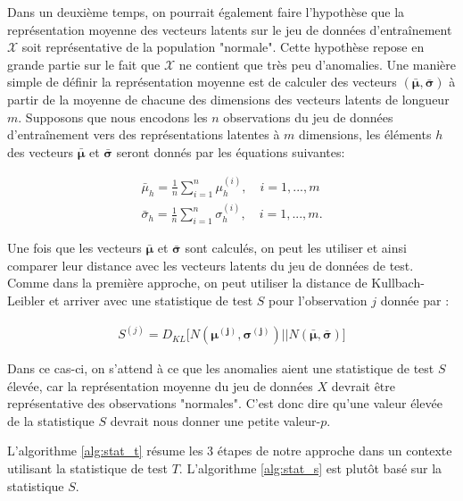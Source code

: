 Dans un deuxième temps, on pourrait également faire l'hypothèse que la représentation moyenne des vecteurs latents sur le jeu de données d'entraînement $\mathcal{X}$ soit représentative de la population "normale". Cette hypothèse repose en grande partie sur le fait que $\mathcal{X}$ ne contient que très peu d'anomalies. Une manière simple de définir la représentation moyenne est de calculer des vecteurs $(\boldsymbol{\bar{\mu}}, \boldsymbol{\bar{\sigma}})$ à partir de la moyenne de chacune des dimensions des vecteurs latents de longueur $m$. Supposons que nous encodons les $n$ observations du jeu de données d'entraînement vers des représentations latentes à $m$ dimensions, les éléments $h$ des vecteurs $\boldsymbol{\bar{\mu}}$ et $\boldsymbol{\bar{\sigma}}$ seront donnés par les équations suivantes:

\begin{gather} \label{eq:vecteurs_bar}
\bar{\mu}_{h} = \frac{1}{n} \sum_{i=1}^{n} \mu_{h}^{(i)}, \quad i=1,...,m \\
\bar{\sigma}_{h} = \frac{1}{n} \sum_{i=1}^{n} \sigma_{h}^{(i)}, \quad i=1,...,m.
\end{gather}

Une fois que les vecteurs $\boldsymbol{\bar{\mu}}$ et $\boldsymbol{\bar{\sigma}}$ sont calculés, on peut les utiliser et ainsi comparer leur distance avec les vecteurs latents du jeu de données de test. Comme dans la première approche, on peut utiliser la distance de Kullbach-Leibler et arriver avec une statistique de test $S$ pour l'observation $j$ donnée par :

\begin{gather}  \label{eq:stat_2}
S^{(j)} = D_{KL}\big[N(\boldsymbol{\mu^{(j)}}, \boldsymbol{\sigma^{(j)}}) || N(\boldsymbol{\bar{\mu}},  \boldsymbol{\bar{\sigma}})\big]
\end{gather}

Dans ce cas-ci, on s'attend à ce que les anomalies aient une statistique de test $S$ élevée, car la représentation moyenne du jeu de données $X$ devrait être représentative des observations "normales". C'est donc dire qu'une valeur élevée de la statistique $S$ devrait nous donner une petite valeur-$p$.

L'algorithme \ref{alg:stat_t} résume les 3 étapes de notre approche dans un contexte utilisant la statistique de test $T$. L'algorithme \ref{alg:stat_s} est plutôt basé sur la statistique $S$.

